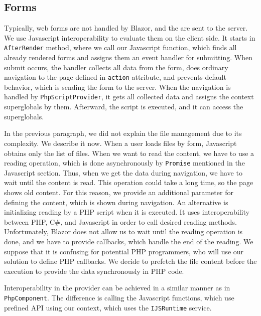 \subsection{Forms}

Typically, web forms are not handled by Blazor, and the are sent to the server.
We use Javascript interoperability to evaluate them on the client side.
It starts in \texttt{AfterRender} method, where we call our Javascript function, which finds all already rendered forms and assigns them an event handler for submitting.
When submit occurs, the handler collects all data from the form, does ordinary navigation to the page defined in \texttt{action} attribute, and prevents default behavior, which is sending the form to the server.
When the navigation is handled by \texttt{PhpScriptProvider}, it gets all collected data and assigns the context superglobals by them.
Afterward, the script is executed, and it can access the superglobals.
\par
In the previous paragraph, we did not explain the file management due to its complexity.
We describe it now.
When a user loads files by form, Javascript obtains only the list of files. 
When we want to read the content, we have to use a reading operation, which is done asynchronously by \texttt{Promise} mentioned in the Javascript section.
Thus, when we get the data during navigation, we have to wait until the content is read.
This operation could take a long time, so the page shows old content.
For this reason, we provide an additional parameter for defining the content, which is shown during navigation.
An alternative is initializing reading by a PHP script when it is executed.
It uses interoperability between PHP, C\#, and Javascript in order to call desired reading methods.
Unfortunately, Blazor does not allow us to wait until the reading operation is done, and we have to provide callbacks, which handle the end of the reading.
We suppose that it is confusing for potential PHP programmers, who will use our solution to define PHP callbacks.
We decide to prefetch the file content before the execution to provide the data synchronously in PHP code.
\par
Interoperability in the provider can be achieved in a similar manner as in \texttt{PhpComponent}.
The difference is calling the Javascript functions, which use prefined API using our context, which uses the \texttt{IJSRuntime} service.


            
 